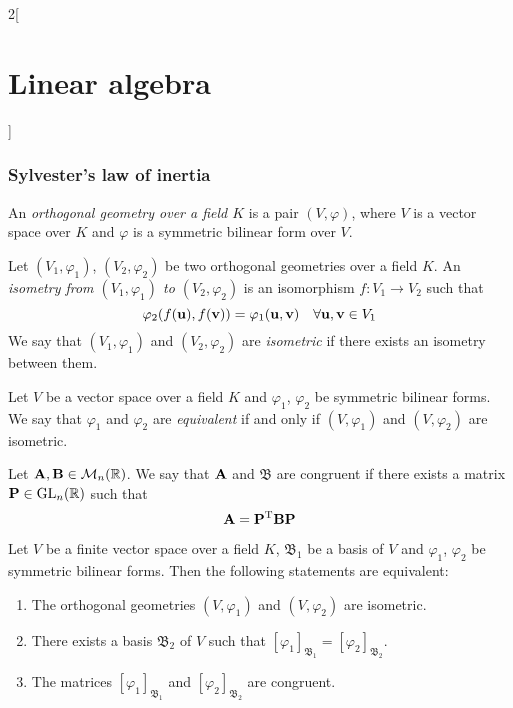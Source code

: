 \documentclass[../../../main.tex]{subfiles}
\begin{document}
\begin{multicols}{2}[\section{Linear algebra}]
    \subsubsection*{Sylvester's law of inertia}
    \begin{definition}
        An \textit{orthogonal geometry over a field $K$} is a pair $(V,\varphi)$, where $V$ is a vector space over $K$ and $\varphi$ is a symmetric bilinear form over $V$.
    \end{definition}
    \begin{definition}\label{isometry}
        Let $(V_1,\varphi_1)$, $(V_2,\varphi_2)$ be two orthogonal geometries over a field $K$. An \textit{isometry from $(V_1,\varphi_1)$ to $(V_2,\varphi_2)$} is an isomorphism $f:V_1\rightarrow V_2$ such that $$\varphi_2(f(\boldsymbol{\mathrm{u}}),f(\boldsymbol{\mathrm{v}}))=\varphi_1(\boldsymbol{\mathrm{u}},\boldsymbol{\mathrm{v}})\quad\forall\boldsymbol{\mathrm{u}},\boldsymbol{\mathrm{v}}\in V_1$$ We say that $(V_1,\varphi_1)$ and $(V_2,\varphi_2)$ are \textit{isometric} if there exists an isometry between them.
    \end{definition}
    \begin{definition}
        Let $V$ be a vector space over a field $K$ and $\varphi_1$, $\varphi_2$ be symmetric bilinear forms. We say that $\varphi_1$ and $\varphi_2$ are \textit{equivalent} if and only if $(V,\varphi_1)$ and $(V,\varphi_2)$ are isometric.
    \end{definition}
    \begin{definition}
        Let $\boldsymbol{\mathrm{A}},\boldsymbol{\mathrm{B}}\in\mathcal{M}_n(\mathbb{R})$. We say that $\boldsymbol{\mathrm{A}}$ and $\mathfrak{B}$ are congruent if there exists a matrix $\boldsymbol{\mathrm{P}}\in\mathrm{GL}_n(\mathbb{R})$ such that $$\boldsymbol{\mathrm{A}}=\vb{P}^{\mathrm{T}}\boldsymbol{\mathrm{B}}\boldsymbol{\mathrm{P}}$$
    \end{definition}
    \begin{prop}
        Let $V$ be a finite vector space over a field $K$, $\mathfrak{B}_1$ be a basis of $V$ and $\varphi_1$, $\varphi_2$ be symmetric bilinear forms. Then the following statements are equivalent:
        \begin{enumerate}
            \item The orthogonal geometries $(V,\varphi_1)$ and $(V,\varphi_2)$ are isometric.
            \item There exists a basis $\mathfrak{B}_2$ of $V$ such that $[\varphi_1]_{\mathfrak{B}_1}=[\varphi_2]_{\mathfrak{B}_2}$.
            \item The matrices $[\varphi_1]_{\mathfrak{B}_1}$ and $[\varphi_2]_{\mathfrak{B}_2}$ are congruent.

\end{enumerate}
\end{prop}
\end{multicols}
\end{document}
